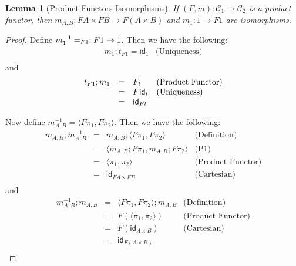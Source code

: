 \documentclass{article}
\let\mto\to
\let\to\relax
\newcommand{\to}{\rightarrow}
\let\t\relax
\newcommand{\cat}[1]{\mathcal{#1}}
\newcommand{\id}[0]{\mathsf{id}}
\newcommand{\t}[0]{\mathsf{t}}
\newtheorem{lemma}[theorem]{Lemma}
\begin{document}
\begin{lemma}[Product Functors Isomorphisms]
  \label{lemma:product_functors_iso}
  If $(F,m) : \cat{C}_1 \mto \cat{C}_2$ is a product functor, then
  $m_{A,B} : FA \times FB \mto F(A \times B)$ and $m_1 : 1 \mto F1$ are
  isomorphisms.
\end{lemma}
\begin{proof}
  Define $m^{-1}_1 = \t_{F 1} : F1 \mto 1$.  Then we have the following:
  \[
  \begin{array}{lll}
    m_1;t_{F1} = \id_{1} & \text{(Uniqueness)}\\    
  \end{array}
  \]
  and
  \[
  \begin{array}{llll}
    t_{F1};m_1
    & = & F\t_t & \text{(Product Functor)}\\
    & = & F\id_t & \text{(Uniqueness)}\\
    & = & \id_{Ft}     
  \end{array}
  \]

  Now define $m^{-1}_{A,B} = \langle F\pi_1, F\pi_2 \rangle$.  Then we have the following:
  \[
  \begin{array}{llll}
    m_{A,B};m^{-1}_{A,B}
    & = & m_{A,B};\langle F\pi_1, F\pi_2 \rangle & \text{(Definition)}\\
    & = & \langle m_{A,B};F\pi_1, m_{A,B};F\pi_2 \rangle & \text{(P1)}\\
    & = & \langle \pi_1, \pi_2 \rangle & \text{(Product Functor)}\\
    & = & \id_{FA \times FB} & \text{(Cartesian)}\\
  \end{array}
  \]
  and
  \[
  \begin{array}{llll}
    m^{-1}_{A,B};m_{A,B}
    & = & \langle F\pi_1, F\pi_2 \rangle;m_{A,B} & \text{(Definition)}\\
    & = & F(\langle \pi_1, \pi_2 \rangle) & \text{(Product Functor)}\\
    & = & F(\id_{A \times B}) & \text{(Cartesian)}\\
    & = & \id_{F(A \times B)}\\    
  \end{array}
  \]
\end{proof}
\end{document}

